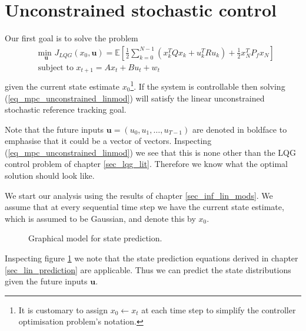 \section{Unconstrained stochastic control}
\label{sec_uncon_lin_control}
Our first goal is to solve the problem 
\begin{equation}
\begin{aligned}
&\underset{\mathbf{u}}{\text{min }} J_{LQG}(x_0, \mathbf{u}) = \mathbb{E}\left[ \frac{1}{2}\sum_{k=0}^{N-1} \left( x_k^TQx_k + u_k^TRu_k \right) + \frac{1}{2}x_N^TP_fx_N \right] \\
& \text{subject to } x_{t+1}=Ax_t+Bu_t + w_t\\
\end{aligned}
\label{eq_mpc_unconstrained_linmod}
\end{equation}
given the current state estimate $x_0$\footnote{It is customary to assign $x_0 \leftarrow x_t$ at each time step to simplify the controller optimisation problem's notation.}. If the system is controllable then solving (\ref{eq_mpc_unconstrained_linmod}) will satisfy the linear unconstrained stochastic reference tracking goal.

Note that the future inputs $\mathbf{u}=(u_0, u_1,\hdots,u_{T-1})$ are denoted in boldface to emphasise that it could be a vector of vectors. Inspecting (\ref{eq_mpc_unconstrained_linmod}) we see that this is none other than the LQG control problem of chapter \ref{sec_lqg_lit}. Therefore we know what the optimal solution should look like.

We start our analysis using the results of chapter \ref{sec_inf_lin_mods}. We assume that at every sequential time step we have the current state estimate, which is assumed to be Gaussian, and denote this by $x_0$. 
\begin{figure}[H] 
\centering
{}
\caption{Graphical model for state prediction.}
\label{fig_gm_mpc}
\end{figure}
Inspecting figure \ref{fig_gm_mpc} we note that the state prediction equations derived in chapter \ref{sec_lin_prediction} are applicable. Thus we can predict the state distributions given the future inputs $\mathbf{u}$.

